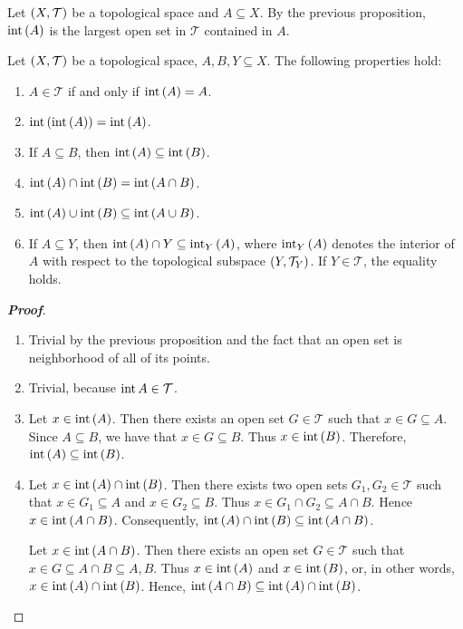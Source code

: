 \begin{remark}
  Let $\left(X,\mathcal{T}\right)$ be a topological space and $A\subseteq X$. By the previous proposition, $\operatorname{int}\left(A\right)$ is the largest open set in $\mathcal{T}$ contained in $A$.
\end{remark}

\begin{proposition}
  Let $\left(X,\mathcal{T}\right)$ be a topological space, $A,B,Y\subseteq X$. The following properties hold:

  \begin{enumerate}
    \item $A\in\mathcal{T}$ if and only if $\operatorname{int}\left(A\right)=A$.
    \item $\operatorname{int}\left(\operatorname{int}\left(A\right)\right)=\operatorname{int}\left(A\right)$.
    \item If $A\subseteq B$, then $\operatorname{int}\left(A\right)\subseteq\operatorname{int}\left(B\right)$.
    \item $\operatorname{int}\left(A\right)\cap\operatorname{int}\left(B\right)=\operatorname{int}\left(A\cap B\right)$.
    \item $\operatorname{int}\left(A\right)\cup\operatorname{int}\left(B\right)\subseteq\operatorname{int}\left(A\cup B\right)$.
    \item If $A\subseteq Y$, then $\operatorname{int}\left(A\right)\cap Y\subseteq\operatorname{int}_Y\left(A\right)$, where $\operatorname{int}_Y\left(A\right)$ denotes the interior of $A$ with respect to the topological subspace $\left(Y,\mathcal{T}_Y\right)$. If $Y\in\mathcal{T}$, the equality holds.
  \end{enumerate}
  \begin{proof}[\rm\textbf{Proof}]
    \hfill
    \begin{enumerate}
      \item Trivial by the previous proposition and the fact that an open set is neighborhood of all of its points.
      \item Trivial, because $\operatorname{int}{A}\in\mathcal{T}$.
      \item Let $x\in\operatorname{int}\left(A\right)$. Then there exists an open set $G\in\mathcal{T}$ such that $x\in G\subseteq A$. Since $A\subseteq B$, we have that $x\in G\subseteq B$. Thus $x\in\operatorname{int}\left(B\right)$. Therefore, $\operatorname{int}\left(A\right)\subseteq\operatorname{int}\left(B\right)$.
      \item Let $x\in\operatorname{int}\left(A\right)\cap\operatorname{int}\left(B\right)$. Then there exists two open sets $G_1,G_2\in\mathcal{T}$ such that $x\in G_1\subseteq A$ and $x\in G_2\subseteq B$. Thus $x\in G_1\cap G_2\subseteq A\cap B$. Hence $x\in\operatorname{int}\left(A\cap B\right)$. Consequently, $\operatorname{int}\left(A\right)\cap\operatorname{int}\left(B\right)\subseteq\operatorname{int}\left(A\cap B\right)$. 
      
      Let $x\in\operatorname{int}\left(A\cap B\right)$. Then there exists an open set $G\in\mathcal{T}$ such that $x\in G\subseteq A\cap B\subseteq A,B$. Thus $x\in\operatorname{int}\left(A\right)$ and $x\in\operatorname{int}\left(B\right)$, or, in other words, $x\in\operatorname{int}\left(A\right)\cap\operatorname{int}\left(B\right)$. Hence, $\operatorname{int}\left(A\cap B\right)\subseteq\operatorname{int}\left(A\right)\cap\operatorname{int}\left(B\right)$. 
      

\end{enumerate}
\end{proof}
\end{proposition}
